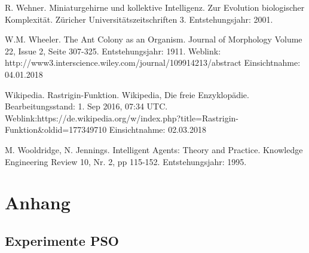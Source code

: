 \documentclass[a4paper, 11pt]{article}
\makeatletter
\newcommand*{\appendixtoc}{
	\begingroup
	\edef\@alltocdepth{\the\value{tocdepth}}
	\setcounter{tocdepth}{-10000}
	\renewcommand*{\contentsname}{
		Verzeichnis der Anh\"ange}
	\renewcommand*{\appendixattoc}{
		\setcounter{tocdepth}{\@alltocdepth}
	}
	\tableofcontents
	\setcounter{tocdepth}{\@alltocdepth}
	\endgroup
}
\newcommand*{\appendixattoc}{
}
\makeatother
\begin{document}
\begin{thebibliography}{sotief}
	R. Wehner. Miniaturgehirne und kollektive Intelligenz. Zur Evolution biologischer Komplexität. Züricher Universitätszeitschriften 3. Entstehungsjahr: 2001. 
	
	W.M. Wheeler. The Ant Colony as an Organism. Journal of Morphology Volume 22, Issue 2, Seite 307-325. Entstehungsjahr: 1911.\newline\newline
	Weblink: http://www3.interscience.wiley.com/journal/109914213/abstract \newline Einsichtnahme: 04.01.2018
	
	Wikipedia. Rastrigin-Funktion. Wikipedia, Die freie Enzyklopädie. Bearbeitungsstand: 1. Sep 2016, 07:34 UTC. \newline\newline 
	Weblink:https://de.wikipedia.org/w/index.php?title=Rastrigin-Funktion\&oldid=177349710\newline
	Einsichtnahme: 02.03.2018
	
	M. Wooldridge, N. Jennings. Intelligent Agents: Theory and Practice. Knowledge Engineering Review 10, Nr. 2, pp 115-152. Entstehungsjahr: 1995.	
\end{thebibliography}
\newpage
\appendix
\appendixtoc
\newpage
\section{Anhang}
\subsection{Experimente \acs{PSO}}
\end{document}
